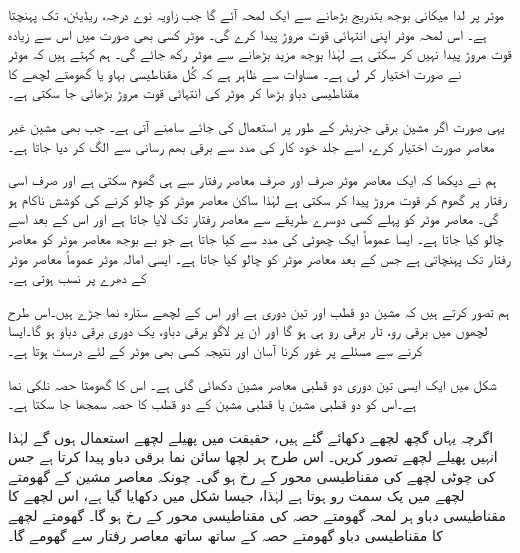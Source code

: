 موٹر پر لدا میکانی بوجھ بتدریج بڑھانے سے ایک لمحہ آئے گا  جب زاویہ  نوے درجہ،   ریڈیئن، تک پہنچتا ہے۔ اس لمحہ موٹر اپنی انتہائی قوت مروڑ  پیدا کرے  گی۔ موٹر کسی بھی صورت میں اس سے زیادہ قوت مروڑ پیدا نہیں کر سکتی ہے لہٰذا  بوجھ  مزید بڑھانے سے موٹر رکھ جائے گی۔ ہم کہتے ہیں کہ موٹر نے  صورت اختیار کر لی ہے۔ مساوات  سے ظاہر ہے کہ کُل مقناطیسی بہاو یا گھومتے لچھے کا مقناطیسی دباو بڑھا کر موٹر کی  انتہائی قوت مروڑ  بڑھائی جا سکتی ہے۔

یہی صورت  اگر مشین برقی جنریٹر کے طور پر استعمال کی جائے سامنے آتی ہے۔ جب بھی مشین غیر معاصر صورت اختیار کرے،  اسے جلد خود کار   کی مدد سے برقی بھم  رسانی سے الگ کر دیا جاتا ہے۔

ہم نے دیکھا کہ ایک معاصر موٹر صرف اور صرف معاصر رفتار سے ہی گھوم سکتی ہے اور صرف اسی رفتار پر گھوم کر قوت مروڑ پیدا کر سکتی ہے لہٰذا ساکن معاصر موٹر کو  چالو  کرنے کی کوشش  ناکام ہو گی۔ معاصر موٹر کو پہلے کسی دوسرے طریقے سے معاصر رفتار تک لایا جاتا ہے اور اس کے بعد  اسے چالو کیا جاتا ہے۔ ایسا عموماً ایک چھوٹی   کی مدد سے کیا جاتا ہے جو بے بوجھ معاصر موٹر کو  معاصر رفتار تک پہنچاتی  ہے جس کے بعد معاصر موٹر کو چالو کیا جاتا ہے۔ ایسی امالہ موٹر عموماً معاصر موٹر کے دھرے پر نسب ہوتی ہے۔

 ہم تصور کرتے ہیں کہ مشین دو قطب اور تین دوری ہے اور اس کے لچھے ستارہ نما جڑے  ہیں۔اس طرح لچھوں میں برقی رو، تار برقی رو ہی ہو گا اور ان پر لاگو برقی دباو، یک دوری برقی دباو ہو گا۔ایسا کرنے سے مسئلے پر غور کرنا آسان  اور نتیجہ کسی بھی موٹر کے لئے درست ہوتا ہے۔

شکل   میں ایک ایسی تین دوری دو قطبی معاصر مشین دکھائی گئی ہے۔ اس کا گھومتا حصہ نلکی نما ہے۔اس کو دو قطبی مشین یا   قطبی مشین کے دو قطب کا حصہ سمجھا جا سکتا ہے۔

 اگرچہ یہاں گچھ لچھے دکھائے گئے ہیں، حقیقت میں پھیلے لچھے  استعمال ہوں گے لہٰذا انہیں  پھیلے لچھے تصور کریں۔ اس طرح ہر لچھا سائن نما برقی دباو پیدا کرتا ہے جس کی چوٹی لچھے کی مقناطیسی محور کے رخ ہو گی۔  چونکہ معاصر مشین کے گھومتے لچھے میں یک سمت  رو ہوتا ہے لہٰذا، جیسا شکل  میں دکھایا گیا ہے، اس لچھے  کا مقناطیسی دباو ہر لمحہ گھومتے حصہ کی مقناطیسی محور کے رخ ہو گا۔ گھومتے لچھے کا مقناطیسی دباو گھومتے حصہ کے ساتھ ساتھ معاصر رفتار سے گھومے گا۔

